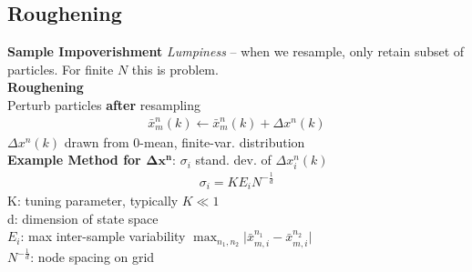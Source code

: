 \subsection{Roughening}
\vspace{0.2em}
\textbf{Sample Impoverishment} \textit{Lumpiness} -- when we resample, only retain subset of particles. For finite $N$ this is problem. \\
\textbf{Roughening} \\
Perturb particles \textbf{after} resampling 
\begin{align*}
    \bar{x}_m^n(k) \leftarrow \bar{x}_m^n (k) + \Delta x^n(k)
\end{align*}
$\Delta x^n(k)$ drawn from 0-mean, finite-var. distribution \\
\textbf{Example Method for $\boldsymbol{\Delta x^n}$}: $\sigma_i$ stand. dev. of $\Delta x_i^n(k)$
\begin{align*}
    \sigma_i = K E_i N^{-\frac{1}{d}}
\end{align*}
K: tuning parameter, typically $K \ll 1$\\
d: dimension of state space\\
$E_i$: max inter-sample variability $\max_{n_1, n_2} \lvert \bar{x}_{m,i}^{n_1} - \bar{x}_{m,i}^{n_2} \rvert$\\
$N^{-\frac{1}{d}}$: node spacing on grid


\vfill\null\columnbreak